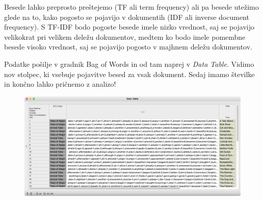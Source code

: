 Besede lahko preprosto preštejemo (TF ali term frequency) ali pa besede utežimo glede na to, kako pogosto se pojavijo v dokumentih (IDF ali inverse document frequency). S TF-IDF bodo pogoste besede imele nizko vrednost, saj se pojavijo velikokrat pri velikem deležu dokumentov, medtem ko bodo imele pomembne besede visoko vrednost, saj se pojavijo pogosto v majhnem deležu dokumentov.

Podatke pošilje v gradnik Bag of Words in od tam naprej v \textit{Data Table}. Vidimo nov stolpec, ki vsebuje pojavitve besed za vsak dokument. Sedaj imamo številke in končno lahko pričnemo z analizo!

\begin{figure}[h]
    \includegraphics[width=\linewidth]{vreca-besed-table.png}%
    \caption{}
    \label{fig:004-vreca-besed-table}
  \end{figure}
